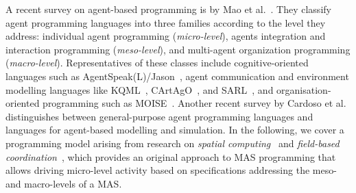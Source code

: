 A recent survey on agent-based programming 
 is by Mao et al.~\cite{DBLP:journals/wias/MaoWY17}.
%
They classify agent programming languages 
 into three families according to the level they address:
 individual agent programming (\emph{micro-level}),
 agents integration and interaction programming (\emph{meso-level}),
 and 
 multi-agent organization programming (\emph{macro-level}).
%
Representatives 
 of these classes
 include cognitive-oriented languages
 such as AgentSpeak(L)/Jason~\cite{bordini2007programming-mas-agentspeak},
 agent communication and environment modelling languages
 like KQML~\cite{DBLP:conf/cikm/FininFMM94}, CArtAgO~\cite{DBLP:books/sp/09/RicciPVO09}, and SARL~\cite{DBLP:conf/webi/RodriguezGG14},
 and organisation-oriented programming such as MOISE~\cite{DBLP:journals/ijaose/HubnerSB07}.
%
Another recent survey by Cardoso et al.~\cite{computers10020016}
 distinguishes between general-purpose agent programming languages
  and languages for agent-based modelling and simulation.
%
In the following, we cover a programming model
 arising from research on \emph{spatial computing}~\cite{dagstuhl2006seminar-space-oriented-computation,DBLP:journals/corr/abs-1202-5509}
 and \emph{field-based coordination}~\cite{DBLP:books/daglib/0015276,viroli2019jlamp-si-coord},
 which provides an original approach
 to MAS programming
 that allows driving micro-level activity
 based on specifications
 addressing the meso- and macro-levels of a MAS.

